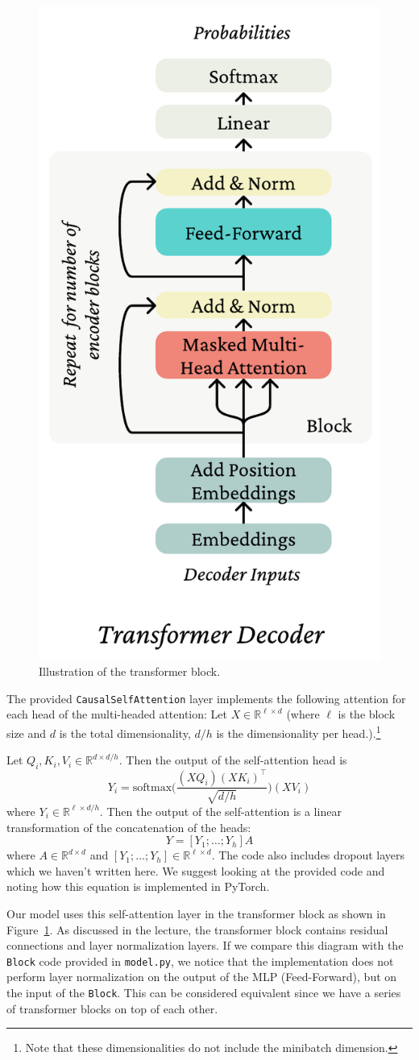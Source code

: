 \begin{parts}
\begin{figure}[h]
\centering
\captionsetup{justification=centering}
\includegraphics[height=0.6\linewidth]{images/decoder.pdf}
\caption{Illustration of the transformer block.}
\label{fig:tranformer_block}
\end{figure}

The provided \texttt{CausalSelfAttention} layer implements the following attention for each head of the multi-headed attention: Let $X\in \mathbb{R}^{\ell \times d}$ (where $\ell$ is the block size and $d$ is the total dimensionality, $d/h$ is the dimensionality per head.).\footnote{Note that these dimensionalities do not include the minibatch dimension.}

Let $Q_i,K_i,V_i \in \mathbb{R}^{d\times d/h}$.
Then the output of the self-attention head is 
\begin{equation} \label{qkv_eqn}
Y_i = \text{softmax}\bigg(\frac{(XQ_i)(XK_i)^\top}{\sqrt{d/h}}\bigg)(XV_i)
\end{equation}
where $Y_i\in\mathbb{R}^{\ell \times d/h}$.
Then the output of the self-attention is a linear transformation of the concatenation of the heads:
\begin{equation}
Y = [Y_1;\dots;Y_h]A
\end{equation}
where $A \in\mathbb{R}^{d\times d}$ and $[Y_1;\dots;Y_h]\in\mathbb{R}^{\ell \times d}$.
The code also includes dropout layers which we haven't written here.
We suggest looking at the provided code and noting how this equation is implemented in PyTorch.

Our model uses this self-attention layer in the transformer block as shown in Figure~\ref{fig:tranformer_block}. As discussed in the lecture, the transformer block contains residual connections and layer normalization layers. If we compare this diagram with the \texttt{Block} code provided in \texttt{model.py}, we notice that the implementation does not perform layer normalization on the output of the MLP (Feed-Forward), but on the input of the \texttt{Block}. This can be considered equivalent since we have a series of transformer blocks on top of each other. 


\end{parts}
